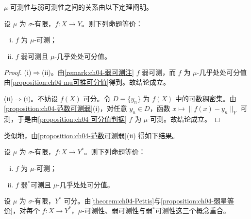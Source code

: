 \documentclass[../../main.tex]{subfiles}%
\begin{document}
$\mu$-可测性与弱可测性之间的关系由以下定理阐明。

\begin{theorem}[Pettis]\label{theorem:ch04-Pettis}
设 $\mu$ 为 $\sigma$-有限，$f:X\to Y$。则下列命题等价：
\begin{enumerate}[(i)]
\item\label{item:ch04-Pettis-i} $f$ 为 $\mu$-可测；
\item\label{item:ch04-Pettis-ii} $f$ 弱可测且 $\mu$-几乎处处可分值。
\end{enumerate}
\end{theorem}

\begin{proof}
(i)$\Rightarrow$(ii)。由\cref{remark:ch04-弱可测注} $f$ 弱可测，而 $f$ 为 $\mu$-几乎处处可分值由\cref{proposition:ch04-mu可推可分值}得到。故结论成立。

(ii)$\Rightarrow$(i)。不妨设 $f(X)$ 可分。令 $D\equiv\{y_n\}$ 为 $f(X)$ 中的可数稠密集。由\cref{proposition:ch04-范数可测弱}(i)，对任意 $y_n\in D$，函数 $x\mapsto\|f(x)-y_n\|_Y$ 可测，于是由\cref{proposition:ch04-可分值判据} $f$ 为 $\mu$-可测。故结论成立。
\end{proof}

类似地，由\cref{proposition:ch04-范数可测弱}(ii) 得如下结果。

\begin{proposition}\label{proposition:ch04-弱星等价}
设 $\mu$ 为 $\sigma$-有限，$f:X\to Y^*$。则下列命题等价：
\begin{enumerate}[(i)]
\item\label{item:ch04-弱星等价-i} $f$ 为 $\mu$-可测；
\item\label{item:ch04-弱星等价-ii} $f$ 弱$^*$可测且 $\mu$-几乎处处可分值。
\end{enumerate}
\end{proposition}

\begin{remark}\label{remark:ch04-三概念重合}
设 $\mu$ 为 $\sigma$-有限，$Y^*$ 可分。由\cref{theorem:ch04-Pettis}与\cref{proposition:ch04-弱星等价}，对每个 $f:X\to Y^*$，$\mu$-可测性、弱可测性与弱$^*$可测性这三个概念重合。
\end{remark}
\end{document}
